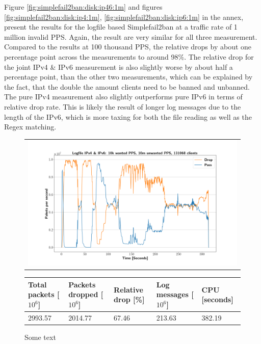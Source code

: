 Figure \ref{fig:simplefail2ban:disk:ip46:1m} and figures \ref{fig:simplefail2ban:disk:ip4:1m}, \ref{fig:simplefail2ban:disk:ip6:1m} in the annex, present the results
for the logfile based Simplefail2ban at a traffic rate of 1 million invalid \ac{PPS}. Again, the result are very similar for all three measurement. Compared to the results at 100 thousand \ac{PPS},
the relative drops by about one percentage point across the measurements to around 98\%. The relative drop for the joint \ac{IPv4} \& \ac{IPv6} measurement is also slightly worse by about half a percentage point, than the
other two measurements, which can be explained by the fact, that the double the amount clients need to be banned and unbanned. The pure \ac{IPv4} measurement also slightly outperforms pure \ac{IPv6} in terms of relative
drop rate. This is likely the result of longer log messages due to the length of the \ac{IPv6}, which is more taxing for both the file reading as well as the \ac{Regex} matching.      

\begin{figure}[!h]
	\centering
	\scriptsize
	\begin{tabular}{c}
    	\centerline{\includegraphics[width=1.2\textwidth]{images/simplefail2ban_disk_ipv46_v10k_iv10m_c131068.png}}
	\end{tabular}
	\begin{tabular}{lllll}
		\toprule
		\textbf{Total packets [$10^6$]} & \textbf{Packets dropped [$10^6$]} & \textbf{Relative drop [\%]} & \textbf{Log messages [$10^6$]} & \textbf{CPU [seconds]} \\ \midrule 
		2993.57 & 2014.77 & 67.46 & 213.63 & 382.19 \\
		\bottomrule
	\end{tabular}
	\caption[Simplefail2ban, Logfile IPv4 \& IPv6, 10m \ac{PPS}]{Some text}
	\label{fig:simplefail2ban:disk:ip46:10m}
\end{figure}


